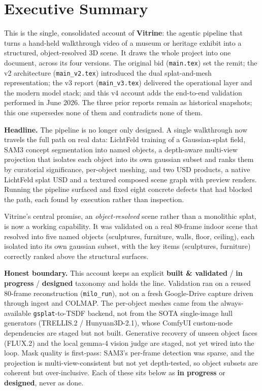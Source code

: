 \documentclass[a4paper,11pt]{report}
\newcommand{\chip}[2]{\textcolor{#1}{\textbf{#2}}}
\newcommand{\code}[1]{\texttt{#1}}
\newcommand{\validated}{\chip{SuccessGreen}{built \& validated}}
\newcommand{\wip}{\chip{WarningAmber}{in progress}}
\newcommand{\designed}{\chip{MidGrey}{designed}}
\begin{document}

\chapter*{Executive Summary}

This is the single, consolidated account of \textbf{Vitrine}: the agentic pipeline that turns a hand-held
walkthrough video of a museum or heritage exhibit into a structured, object-resolved 3D scene. It draws
the whole project into one document, across its four versions. The original bid (\code{main.tex}) set the
remit; the v2 architecture (\code{main\_v2.tex}) introduced the dual splat-and-mesh representation; the v3
report (\code{main\_v3.tex}) delivered the operational layer and the modern model stack; and
this v4 account adds the end-to-end validation performed in June 2026. The three prior reports remain as
historical snapshots; this one supersedes none of them and contradicts none of them.

\textbf{Headline.} The pipeline is no longer only designed. A single walkthrough now travels the full path
on real data: LichtFeld training of a Gaussian-splat field, SAM3 concept segmentation into named objects,
a depth-aware multi-view projection that isolates each object into its own gaussian subset and ranks them
by curatorial significance, per-object meshing, and two USD products, a native LichtFeld splat USD and a
textured composed scene graph with preview renders. Running the pipeline surfaced and fixed eight concrete
defects that had blocked the path, each found by execution rather than inspection.

\begin{keyfinding}
Vitrine's central promise, an \emph{object-resolved} scene rather than a monolithic splat, is now a working
capability. It was validated on a real 80-frame indoor scene that resolved into five named objects
(sculptures, furniture, walls, floor, ceiling), each isolated into its own gaussian subset, with the key
items (sculptures, furniture) correctly ranked above the structural surfaces.
\end{keyfinding}

\textbf{Honest boundary.} This account keeps an explicit \validated{} / \wip{} / \designed{} taxonomy and
holds the line. Validation ran on a reused 80-frame reconstruction (\code{milo\_run}), not on a fresh
Google-Drive capture driven through ingest and COLMAP. The per-object meshes came from the
always-available \code{gsplat}-to-TSDF backend, not from the SOTA single-image hull generators
(TRELLIS.2 / Hunyuan3D-2.1), whose ComfyUI custom-node dependencies are staged but not built. Generative
recovery of unseen object faces (FLUX.2) and the local gemma-4 vision judge are staged, not yet wired into
the loop. Mask quality is first-pass: SAM3's per-frame detection was sparse, and the projection is
multi-view-consistent but not yet depth-tested, so object subsets are coherent but over-inclusive. Each of
these sits below as \wip{} or \designed{}, never as done.
\end{document}

